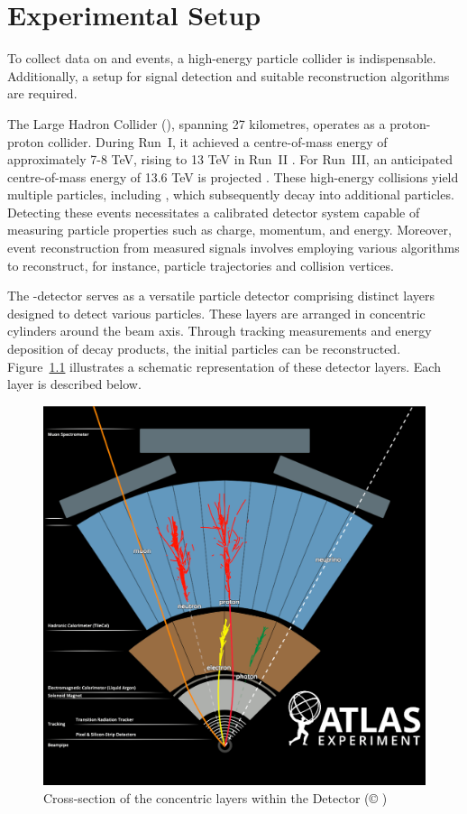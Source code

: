 \chapter{Experimental Setup}
\label{ch:experimental_setup}
To collect data on \ttbarZ and \ttbarW events, a high-energy particle collider is indispensable. Additionally, a setup for signal detection and suitable reconstruction algorithms are required.

The Large Hadron Collider (\lhc), spanning 27 kilometres, operates as a proton-proton collider. During Run~I, it achieved a centre-of-mass energy of approximately 7-8 TeV, rising to 13 TeV in Run~II \cite{lhc2}. For Run~III, an anticipated centre-of-mass energy of 13.6 TeV is projected \cite{lhc_run3}. These high-energy collisions yield multiple particles, including \tquarks, which subsequently decay into additional particles. Detecting these events necessitates a calibrated detector system capable of measuring particle properties such as charge, momentum, and energy. Moreover, event reconstruction from measured signals involves employing various algorithms to reconstruct, for instance, particle trajectories and collision vertices.

The \atlas-detector \cite{atlas} serves as a versatile particle detector comprising distinct layers designed to detect various particles. These layers are arranged in concentric cylinders around the beam axis. Through tracking measurements and energy deposition of decay products, the initial particles can be reconstructed. Figure~\ref{fig:atlas} illustrates a schematic representation of these detector layers. Each layer is described below.

\begin{figure}[t]
    \centering
    \includegraphics[width=.61\textwidth]{figures/atlas/atlas3.png}
    \caption{Cross-section of the concentric layers within the \atlas Detector (\copyright{} \cern)}
    \label{fig:atlas}
\end{figure}

